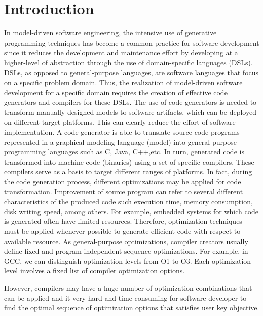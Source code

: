 \section{Introduction}
In model-driven software engineering, the intensive use of generative programming techniques has become a common practice for software development since it reduces the development and maintenance effort by developing at a higher-level of abstraction through the use of domain-specific languages (DSLs)\cite{brambilla2012model}. 
DSLs, as opposed to general-purpose languages, are software languages that focus on a specific problem domain. Thus, the realization of model-driven software development for a specific domain requires the creation of effective code generators and compilers for these DSLs.
The use of code generators is needed to transform manually designed models to software artifacts, which can be deployed on different target platforms. This can clearly reduce the effort of software implementation. A code generator is able to translate source code programs represented in a graphical modeling language (model) into general purpose programming languages such as C, Java, C++,etc. In turn, generated code is transformed into machine code (binaries) using a set of specific compilers.
These compilers serve as a basis to target different ranges of platforms. 
In fact, during the code generation process, different optimizations may be applied for code transformation. Improvement of source program can refer to several different characteristics of the produced code such execution time, memory consumption, disk writing speed, among others.
For example, embedded systems for which code is generated often have limited resources. Therefore, optimization techniques must be applied whenever possible to generate efficient code with respect to available resource. 
As general-purpose optimizations, compiler creators usually
define fixed and program-independent sequence optimizations.
For example, in GCC, we can distinguish optimization levels
from O1 to O3. Each optimization level involves a fixed list of compiler optimization options. 

However, compilers may have a huge number of optimization
combinations that can be applied and it very hard and time-consuming for software developer to find the
optimal sequence of optimization options that satisfies user
key objective. 

